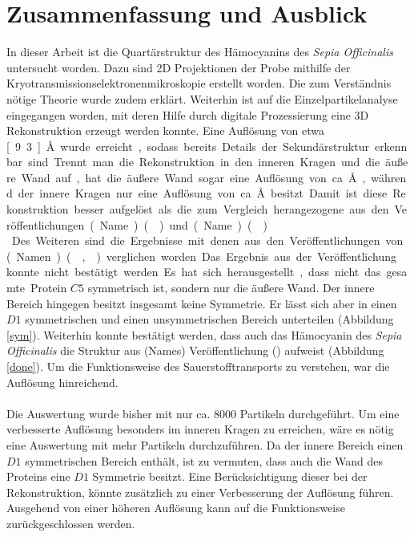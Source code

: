 \chapter{Zusammenfassung und Ausblick}

In dieser Arbeit ist die Quartärstruktur des Hämocyanins des \textit{Sepia Officinalis} untersucht worden.
Dazu sind 2D Projektionen der Probe mithilfe der Kryotransmissionselektronenmikroskopie erstellt worden. 
Die zum Verständnis nötige Theorie wurde zudem erklärt.
Weiterhin ist auf die Einzelpartikelanalyse eingegangen worden, mit deren Hilfe durch digitale Prozessierung eine 3D Rekonstruktion erzeugt werden konnte.
Eine Auflösung von etwa \unit[9.3]{\AA} wurde erreicht, sodass bereits Details der Sekundärstruktur erkennbar sind.
Trennt man die Rekonstruktion in den inneren Kragen und die äußere Wand auf, hat die äußere Wand sogar eine Auflösung von ca. \unit[8]{\AA}, während der innere Kragen nur eine Auflösung von ca. \unit[10]{\AA} besitzt.
Damit ist diese Rekonstruktion besser aufgelöst als die zum Vergleich herangezogene aus den Veröffentlichungen (Name) (\cite{bla}) und (Name) (\cite{blubb}).\\


Des Weiteren sind die Ergebnisse mit denen aus den Veröffentlichungen von (Namen) (\cite{bla}, \cite{blubb}) verglichen worden.
Das Ergebnis aus der Veröffentlichung \cite{bla} konnte nicht bestätigt werden. Es hat sich herausgestellt, dass nicht das gesamte Protein $C5$ symmetrisch ist, sondern nur die äußere Wand.
Der innere Bereich hingegen besitzt insgesamt keine Symmetrie. Er lässt sich aber in einen $D1$ symmetrischen und einen unsymmetrischen Bereich unterteilen (Abbildung \ref{sym}).
Weiterhin konnte bestätigt werden, dass auch das Hämocyanin des \textit{Sepia Officinalis} die Struktur aus (Names) Veröffentlichung (\cite{blubb}) aufweist (Abbildung \ref{done}).
Um die Funktionsweise des Sauerstofftransports zu verstehen, war die Auflösung hinreichend.
\\
\\
Die Auswertung wurde bisher mit nur ca. 8000 Partikeln durchgeführt.
Um eine verbesserte Auflösung besonders im inneren Kragen zu erreichen, wäre es nötig eine Auswertung mit mehr Partikeln durchzuführen.
Da der innere Bereich einen $D1$ symmetrischen Bereich enthält, ist zu vermuten, dass auch die Wand des Proteins eine $D1$ Symmetrie besitzt.
Eine Berücksichtigung dieser bei der Rekonstruktion, könnte zusätzlich zu einer Verbesserung der Auflösung führen.
Ausgehend von einer höheren Auflösung kann auf die Funktionsweise zurückgeschlossen werden.